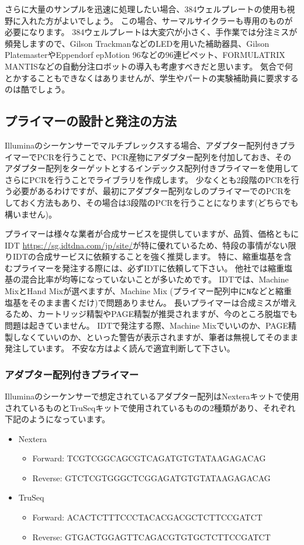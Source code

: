 \documentclass[titlepage,10pt,a4paper,uplatex]{jsbook}
\begin{document}
さらに大量のサンプルを迅速に処理したい場合、384ウェルプレートの使用も視野に入れた方がよいでしょう。
この場合、サーマルサイクラーも専用のものが必要になります。
384ウェルプレートは大変穴が小さく、手作業では分注ミスが頻発しますので、Gilson TrackmanなどのLEDを用いた補助器具、Gilson PlatemasterやEppendorf epMotion 96などの96連ピペット、FORMULATRIX MANTISなどの自動分注ロボットの導入も考慮すべきだと思います。
気合で何とかすることもできなくはありませんが、学生やパートの実験補助員に要求するのは酷でしょう。

\subsection{プライマーの設計と発注の方法}

Illuminaのシーケンサーでマルチプレックスする場合、アダプター配列付きプライマーでPCRを行うことで、PCR産物にアダプター配列を付加しておき、そのアダプター配列をターゲットとするインデックス配列付きプライマーを使用してさらにPCRを行うことでライブラリを作成します。
少なくとも2段階のPCRを行う必要があるわけですが、最初にアダプター配列なしのプライマーでのPCRをしておく方法もあり、その場合は3段階のPCRを行うことになります(どちらでも構いません)。

プライマーは様々な業者が合成サービスを提供していますが、品質、価格ともにIDT \url{https://sg.idtdna.com/jp/site/}が特に優れているため、特段の事情がない限りIDTの合成サービスに依頼することを強く推奨します。
特に、縮重塩基を含むプライマーを発注する際には、必ずIDTに依頼して下さい。
他社では縮重塩基の混合比率が均等になっていないことが多いためです。
IDTでは、Machine MixとHand Mixが選べますが、Machine Mix (プライマー配列中に\texttt{N}などと縮重塩基をそのまま書くだけ)で問題ありません。
長いプライマーは合成ミスが増えるため、カートリッジ精製やPAGE精製が推奨されますが、今のところ脱塩でも問題は起きていません。
IDTで発注する際、Machine Mixでいいのか、PAGE精製しなくていいのか、といった警告が表示されますが、筆者は無視してそのまま発注しています。
不安な方はよく読んで適宜判断して下さい。

\subsubsection{アダプター配列付きプライマー}

Illuminaのシーケンサーで想定されているアダプター配列はNexteraキットで使用されているものとTruSeqキットで使用されているものの2種類があり、それぞれ下記のようになっています。

\begin{itemize}
\item Nextera
\begin{itemize}
\item Forward: TCGTCGGCAGCGTCAGATGTGTATAAGAGACAG
\item Reverse: GTCTCGTGGGCTCGGAGATGTGTATAAGAGACAG
\end{itemize}
\item TruSeq
\begin{itemize}
\item Forward: ACACTCTTTCCCTACACGACGCTCTTCCGATCT
\item Reverse: GTGACTGGAGTTCAGACGTGTGCTCTTCCGATCT
\end{itemize}
\end{itemize}
\end{document}
